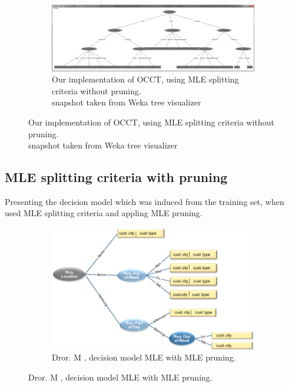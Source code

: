 \documentclass[a4paper,12pt]{article}
\begin{document}
\begin{spacing}{1.5}
\begin{figure}[!h]
\begin{subfigure}[!h]{1\textwidth}
  \centering
  \includegraphics[width=1\textwidth]{Figures/Eval/TreeOut}
  \caption{Our implementation of OCCT, using MLE splitting criteria without pruning.\\ snapshot taken from Weka tree visualizer}
\end{subfigure}
\end{figure}

\subsection{MLE splitting criteria with pruning}
Presenting the decision model which was induced from the training set, when used MLE splitting criteria and appling MLE pruning.

\begin{figure}[!h]
  \centering
  \begin{subfigure}[!h]{1\textwidth}
  \includegraphics[width=1\textwidth]{Figures/Eval/MaayanMLEwP}
  \caption{Dror. M \cite{dror2011thesis}, decision model MLE with MLE pruning.}
\end{subfigure}


\end{figure}
\end{spacing}
\end{document}
